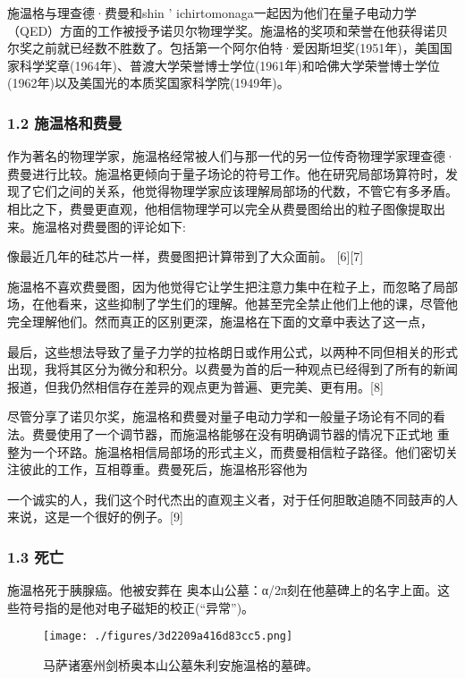 施温格与理查德·费曼和shin ' ichirtomonaga一起因为他们在量子电动力学（QED）方面的工作被授予诺贝尔物理学奖。施温格的奖项和荣誉在他获得诺贝尔奖之前就已经数不胜数了。包括第一个阿尔伯特·爱因斯坦奖(1951年)，美国国家科学奖章(1964年)、普渡大学荣誉博士学位(1961年)和哈佛大学荣誉博士学位(1962年)以及美国光的本质奖国家科学院(1949年)。

\subsubsection{1.2 施温格和费曼}
作为著名的物理学家，施温格经常被人们与那一代的另一位传奇物理学家理查德·费曼进行比较。施温格更倾向于量子场论的符号工作。他在研究局部场算符时，发现了它们之间的关系，他觉得物理学家应该理解局部场的代数，不管它有多矛盾。相比之下，费曼更直观，他相信物理学可以完全从费曼图给出的粒子图像提取出来。施温格对费曼图的评论如下:

像最近几年的硅芯片一样，费曼图把计算带到了大众面前。 [6][7]

施温格不喜欢费曼图，因为他觉得它让学生把注意力集中在粒子上，而忽略了局部场，在他看来，这些抑制了学生们的理解。他甚至完全禁止他们上他的课，尽管他完全理解他们。然而真正的区别更深，施温格在下面的文章中表达了这一点，

最后，这些想法导致了量子力学的拉格朗日或作用公式，以两种不同但相关的形式出现，我将其区分为微分和积分。以费曼为首的后一种观点已经得到了所有的新闻报道，但我仍然相信存在差异的观点更为普遍、更完美、更有用。[8]

尽管分享了诺贝尔奖，施温格和费曼对量子电动力学和一般量子场论有不同的看法。费曼使用了一个调节器，而施温格能够在没有明确调节器的情况下正式地 重整为一个环路。施温格相信局部场的形式主义，而费曼相信粒子路径。他们密切关注彼此的工作，互相尊重。费曼死后，施温格形容他为

一个诚实的人，我们这个时代杰出的直观主义者，对于任何胆敢追随不同鼓声的人来说，这是一个很好的例子。[9]

\subsubsection{1.3 死亡}
施温格死于胰腺癌。他被安葬在 奥本山公墓：α/2π刻在他墓碑上的名字上面。这些符号指的是他对电子磁矩的校正(“异常”)。
\begin{figure}[ht]
\centering
\texttt{[image: ./figures/3d2209a416d83cc5.png]}
\caption{马萨诸塞州剑桥奥本山公墓朱利安施温格的墓碑。} \label{fig_Julian_1}
\end{figure}

